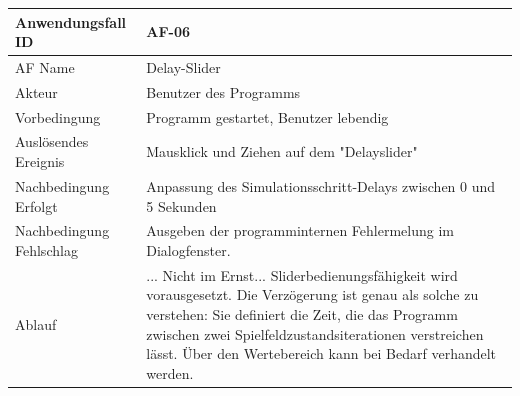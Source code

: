 \documentclass[11pt,a4paper]{article}
\begin{document}
\begin{tabular}[m]{|m{7cm}|m{9cm}|}
    \hline
    Anwendungsfall ID     & AF-06 \\
         \hline
    AF Name     &  Delay-Slider\\
         \hline
    Akteur&Benutzer des Programms \\
    \hline
    Vorbedingung&Programm gestartet, Benutzer lebendig\\
    \hline
    Auslösendes Ereignis& Mausklick und Ziehen auf dem "Delayslider"\\
    \hline
    Nachbedingung Erfolgt&Anpassung des Simulationsschritt-Delays zwischen 0 und 5 Sekunden\\
    \hline
    Nachbedingung Fehlschlag& Ausgeben der programminternen Fehlermelung im Dialogfenster.\\
    \hline
    Ablauf&... Nicht im Ernst... Sliderbedienungsfähigkeit wird vorausgesetzt. \newline Die Verzögerung ist genau als solche zu verstehen: Sie definiert die Zeit, die das Programm zwischen zwei Spielfeldzustandsiterationen verstreichen lässt. Über den Wertebereich kann bei Bedarf verhandelt werden.
    \\
    \hline
\end{tabular}
\par
\end{document}
